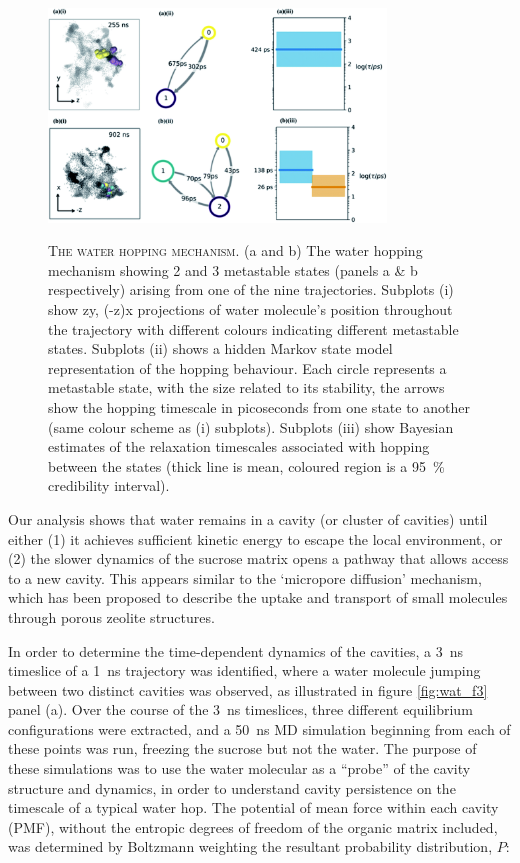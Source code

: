 \begin{figure}
    \centering
    \caption[The water hopping mechanism]{\textsc{The water hopping mechanism}. (a and b) The water hopping mechanism showing 2 and 3 metastable states (panels a \& b respectively) arising from one of the nine trajectories. Subplots (i) show zy, (-z)x projections of water molecule's position throughout the trajectory with different colours indicating different metastable states. Subplots (ii) shows a hidden Markov state model representation of the hopping behaviour. Each circle represents a metastable state, with the size related to its stability, the arrows show the hopping timescale in picoseconds from one state to another (same colour scheme as (i) subplots). Subplots (iii) show Bayesian estimates of the relaxation timescales associated with hopping between the states (thick line is mean, coloured region is a \SI{95}{\percent} credibility interval).}
    \includegraphics[width=0.8\textwidth]{chapters/water_hopping/figures/f4.png}
    \label{fig:wat_f4}
\end{figure}

Our analysis shows that water remains in a cavity (or cluster of cavities) until either (1) it achieves sufficient kinetic energy to escape the local environment, or (2) the slower dynamics of the sucrose matrix opens a pathway that allows access to a new cavity. This appears similar to the `micropore diffusion’ mechanism, which has been proposed to describe the uptake and transport of small molecules through porous zeolite structures\cite{Krishna1997}.

In order to determine the time-dependent dynamics of the cavities, a \SI{3}{\nano\second} timeslice of a \SI{1}{\nano\second} trajectory was identified, where a water molecule jumping between two distinct cavities was observed, as illustrated in figure \ref{fig:wat_f3} panel (a). Over the course of the \SI{3}{\nano\second} timeslices,  three different equilibrium configurations were extracted, and a \SI{50}{\nano\second} MD simulation beginning from each of these points was run, freezing the sucrose but not the water. The purpose of these simulations was to use the water molecular as a ``probe'' of the cavity structure and dynamics, in order to understand cavity persistence on the timescale of a typical water hop. The potential of mean force within each cavity (PMF), without the entropic degrees of freedom of the organic matrix included, was determined by Boltzmann weighting the resultant probability distribution, $P$: 


